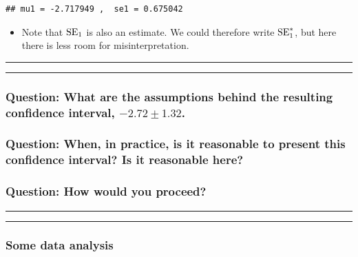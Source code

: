 \documentclass[]{article}
\providecommand{\tightlist}{%
  \setlength{\itemsep}{0pt}\setlength{\parskip}{0pt}}
\begin{document}
\begin{verbatim}
## mu1 = -2.717949 ,  se1 = 0.675042
\end{verbatim}

\begin{itemize}
\tightlist
\item
  Note that \(\mathrm{SE}_1\) is also an estimate. We could therefore write
  \(\mathrm{SE}_1^*\), but here there is less room for
  misinterpretation.
\end{itemize}

\begin{center}\rule{0.5\linewidth}{\linethickness}\end{center}

\begin{center}\rule{0.5\linewidth}{\linethickness}\end{center}

\subsubsection{\texorpdfstring{Question: What are the assumptions behind
the resulting confidence interval,
\(-2.72 \pm 1.32\).}{Question: What are the assumptions behind the resulting confidence interval, -2.72 \textbackslash{}pm 1.32.}}\label{question-what-are-the-assumptions-behind-the-resulting-confidence-interval--2.72-pm-1.32.}

\subsubsection{Question: When, in practice, is it reasonable to present
this confidence interval? Is it reasonable
here?}\label{question-when-in-practice-is-it-reasonable-to-present-this-confidence-interval-is-it-reasonable-here}

\subsubsection{Question: How would you
proceed?}\label{question-how-would-you-proceed}

\begin{center}\rule{0.5\linewidth}{\linethickness}\end{center}

\begin{center}\rule{0.5\linewidth}{\linethickness}\end{center}

\subsubsection{Some data analysis}\label{some-data-analysis}
\end{document}
